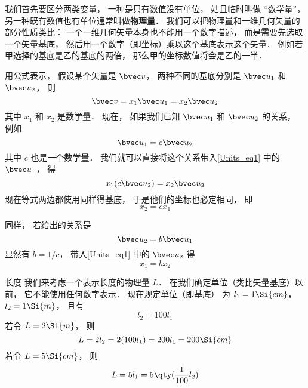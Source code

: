 

我们首先要区分两类变量， 一种是只有数值没有单位， 姑且临时叫做 “数学量”， 另一种既有数值也有单位通常叫做\textbf{物理量}． 我们可以把物理量和一维几何矢量的部分性质类比： 一个一维几何矢量本身也不能用一个数字描述， 而是需要先选取一个矢量基底， 然后用一个数字（即坐标）乘以这个基底表示这个矢量． 例如若甲选择的基底是乙的基底的两倍， 那么甲的坐标数值将会是乙的一半．

用公式表示， 假设某个矢量是 $\bvec v$， 两种不同的基底分别是 $\bvec u_1$ 和 $\bvec u_2$， 则
\begin{equation}\label{Units_eq1}
\bvec v = x_1 \bvec u_1 = x_2 \bvec u_2
\end{equation}
其中 $x_1$ 和 $x_2$ 是数学量． 现在， 如果我们已知 $\bvec u_1$ 和 $\bvec u_2$ 的关系， 例如
\begin{equation}\label{Units_eq2}
\bvec u_1 = c \bvec u_2
\end{equation}
其中 $c$ 也是一个数学量． 我们就可以直接将这个关系带入\autoref{Units_eq1} 中的 $\bvec u_1$， 得
\begin{equation}
x_1 (c \bvec u_2) = x_2 \bvec u_2
\end{equation}
现在等式两边都使用同样得基底， 于是他们的坐标也必定相同， 即
\begin{equation}
x_2 = c x_1
\end{equation}

同样， 若给出的关系是
\begin{equation}
\bvec u_2 = b\bvec u_1
\end{equation}
显然有 $b = 1/c$， 带入\autoref{Units_eq1} 中的 $\bvec u_2$ 得
\begin{equation}
x_1 = b x_2
\end{equation}


\begin{example}{长度}
我们来考虑一个表示长度的物理量 $L$． 在我们确定单位（类比矢量基底）以前， 它不能使用任何数字表示． 现在规定单位（即基底） 为 $l_1 = 1\Si{cm}$， $l_2 = 1\Si{m}$， 且有
\begin{equation}
l_2 = 100 l_1
\end{equation}
若令 $L = 2\Si{m}$， 则
\begin{equation}
L = 2 l_2 = 2 (100 l_1) = 200 l_1 = 200 \Si{cm}
\end{equation}
若令 $L = 5\Si{cm}$， 则
\begin{equation}
L = 5 l_1 = 5 \qty(\frac{1}{100} l_2)
\end{equation}

\end{example}
